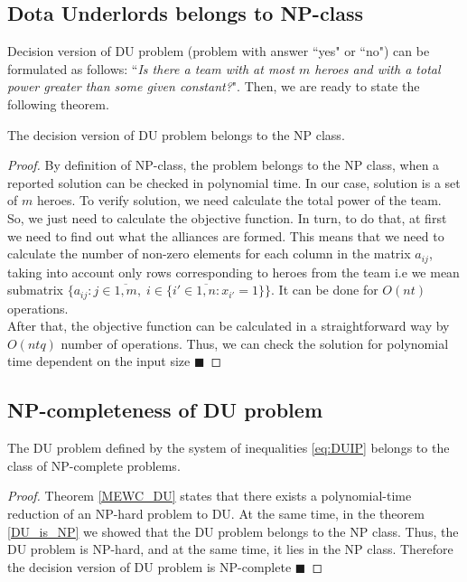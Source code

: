 \documentclass[smallextended]{svjour3}       %
\begin{document}
\subsection{Dota Underlords belongs to NP-class}
Decision version of DU problem (problem with answer ``yes" or ``no") can be formulated as follows: ``\textit{Is there a team with at most $ m $ heroes and with a total power greater than some given constant?}". Then, we are ready to state the following theorem.
\begin{theorem}
\label{DU_is_NP}
The decision version of DU problem belongs to the  NP class.
\end{theorem}
\begin{proof}
By definition of NP-class, the problem belongs to the NP class, when a reported solution can be checked in polynomial time. In our case, solution is a set of $m$ heroes. To verify solution, we need calculate the total power of the team.\\
So, we just need to calculate the objective function. In turn, to do that, at first we need to find out what the alliances are formed. This means that we need to calculate the number of non-zero elements for each column in the matrix $a_{ij}$, taking into account only rows corresponding to heroes from the team i.e  we mean submatrix $\{a_{ij}:  j \in \overline{1,m},\; i \in \{  i' \in \overline{1,n} :   x_{i'} = 1 \}  \}$. It can be done for $O(nt)$ operations. \\
After that, the objective function can be calculated in a straightforward way by $O(ntq)$ number of operations. Thus, we can check the solution for polynomial time dependent on the input size  $\blacksquare$
\end{proof}

\subsection{NP-completeness of DU problem}
\begin{theorem}
	The DU problem defined by the system of inequalities \eqref{eq:DUIP}  belongs to the class of NP-complete problems.
\end{theorem}

\begin{proof}
Theorem \ref{MEWC_DU} states that there exists a polynomial-time reduction of an NP-hard problem to DU. At the same time, in the theorem \ref{DU_is_NP} we showed that the DU problem belongs to the NP class. Thus, the DU problem is NP-hard, and at the same time, it lies in the NP class. Therefore the decision version of DU problem is NP-complete $\blacksquare$
\end{proof}
\end{document}
